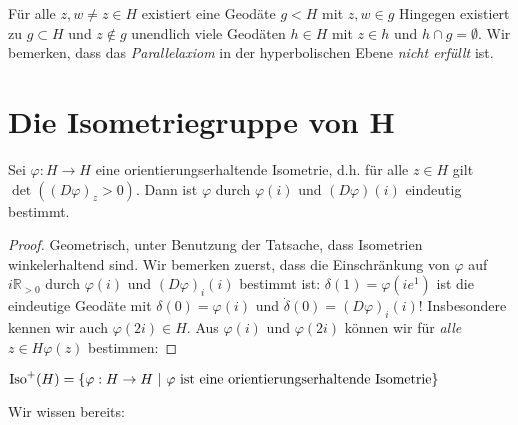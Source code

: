 \documentclass[../main.tex]{subfiles}
\begin{document}
\begin{remark}
    Für alle $z, w \not = z \in H$ existiert eine Geodäte $g < H$ mit $z,w \in g$
    Hingegen existiert zu $g \subset H$ und $z \not \in g$ unendlich viele Geodäten $h \in H$ mit $z \in h$ und $h \cap g = \emptyset$.
    Wir bemerken, dass das \emph{Parallelaxiom} in der hyperbolischen Ebene \emph{nicht erfüllt} ist.
\end{remark}

\section{Die Isometriegruppe von H}
\begin{lemma}
    Sei $\varphi : H \to H$ eine orientierungserhaltende Isometrie,
    d.h. für alle $z \in H$ gilt $\det \left ((D\varphi)_z > 0 \right )$. Dann ist $\varphi$ durch
    $\varphi (i)$ und $(D\varphi)(i)$ eindeutig bestimmt.
\end{lemma}
\begin{proof}
    Geometrisch, unter Benutzung der Tatsache, dass Isometrien winkelerhaltend sind. Wir bemerken zuerst,
    dass die Einschränkung von $\varphi $ auf $i \mathbb{R}_{>0}$ durch $\varphi (i)$ und
    $(D\varphi)_i(i)$ bestimmt ist:
    $\delta (1)=\varphi (ie^1)$ ist die eindeutige Geodäte mit $\delta (0) = \varphi (i)$ und
    $\dot{\delta}(0) = (D\varphi)_i(i)$! Insbesondere kennen wir auch $\varphi (2i)\in H$.
    Aus $\varphi (i)$ und $\varphi(2i)$ können wir für \emph{alle} $z \in H \varphi (z)$ bestimmen:
\end{proof}

\begin{definition}
    $\Iso ^+ (H) = \{ \varphi : H \to H \ | \ \varphi \text{ ist eine orientierungserhaltende Isometrie}\}$ 
\end{definition}

Wir wissen bereits:
\end{document}
